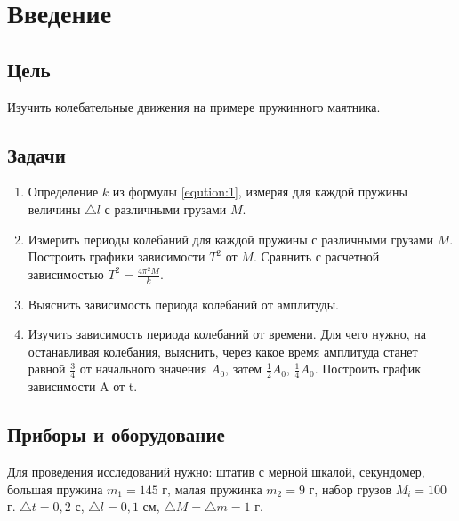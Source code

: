 \section{Введение}
\subsection{Цель}
Изучить колебательные движения на примере пружинного маятника.
\subsection{Задачи}
\begin{enumerate}
	\item Определение $k$ из формулы \ref{eqution:1}, измеряя для каждой пружины величины $\triangle l$ с различными грузами $M$.
	
	\item Измерить периоды колебаний для каждой пружины с различными грузами $M$. Построить графики зависимости $T^2$ от $M$. Сравнить с расчетной зависимостью $T^2 = \frac{4 \pi ^ 2 M}{k}$.
	
	\item Выяснить зависимость периода колебаний от амплитуды.
	
	\item Изучить зависимость периода колебаний от времени. Для чего нужно, на останавливая колебания, выяснить, через какое время амплитуда станет равной $\frac{3}{4}$ от начального значения $A_0$, затем $\frac{1}{2} A_0$, $\frac{1}{4} A_0$. Построить график зависимости A от t.
\end{enumerate}
\subsection{Приборы и оборудование}
Для проведения исследований нужно: штатив с мерной шкалой, секундомер, большая пружина $m_1 = 145$ г, малая пружинка $m_2 = 9$ г, набор грузов  $M_i = 100$ г. $\triangle t = 0,2$ с, $\triangle l = 0,1$ см, $\triangle M = \triangle m = 1$ г.